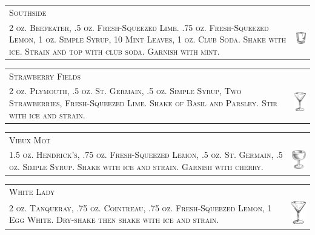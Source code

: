 \documentclass{article}
\begin{document}
\begin{tabular}{b{2.5in} m{0.625in}}
  \multicolumn{2}{p{3.0in}}{\centering\Huge\textsc{Southside}} \\ 
  \textsc{2 oz. Beefeater, .5 oz. Fresh-Squeezed Lime. .75 oz. Fresh-Squeezed
  Lemon, 1 oz. Simple Syrup, 10 Mint Leaves, 1 oz. Club Soda. Shake with
  ice. Strain and top with club soda. Garnish with mint.} &
  \includegraphics[width=0.5in]{rocks_glass.png}
\end{tabular}

\begin{tabular}{b{2.5in} m{0.625in}}
  \multicolumn{2}{p{3.0in}}{\centering\Huge\textsc{Strawberry Fields}} \\ 
  \textsc{2 oz. Plymouth, .5 oz. St. Germain, .5 oz. Simple Syrup, Two Strawberries,
  Fresh-Squeezed Lime. Shake of Basil and Parsley. Stir with ice and strain.} &
  \includegraphics[width=0.5in]{goblet.png}
\end{tabular}

\begin{tabular}{b{2.5in} m{0.625in}}
  \multicolumn{2}{p{3.0in}}{\centering\Huge\textsc{Vieux Mot}} \\ 
  \textsc{1.5 oz. Hendrick's, .75 oz. Fresh-Squeezed Lemon, .5 oz. St. Germain,
  .5 oz. Simple Syrup. Shake with ice and strain. Garnish with cherry.} &
  \includegraphics[width=0.5in]{coupe.png}
\end{tabular}

\begin{tabular}{b{2.5in} m{0.625in}}
  \multicolumn{2}{p{3.0in}}{\centering\Huge\textsc{White Lady}} \\ 
  \textsc{2 oz. Tanqueray, .75 oz. Cointreau, .75 oz. Fresh-Squeezed Lemon,
  1 Egg White. Dry-shake then shake with ice and strain.} &
  \includegraphics[width=0.5in]{goblet.png}
\end{tabular}
\end{document}
